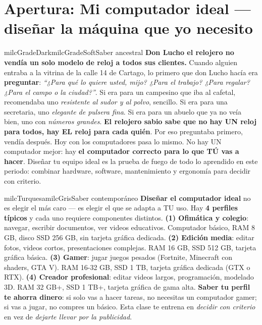 \documentclass[11pt,letterpaper]{article}
\begin{document}
\newpage

\section*{Apertura: Mi computador ideal --- diseñar la máquina que yo necesito}

\begin{softbox}{milcGradeDark}{milcGradeSoft}{Saber ancestral}
\textbf{Don Lucho el relojero no vendía un solo modelo de reloj a todos sus clientes.} Cuando alguien entraba a la vitrina de la calle 14 de Cartago, lo primero que don Lucho hacía era \textbf{preguntar}: \emph{``¿Para qué lo quiere usted, mijo? ¿Para el trabajo? ¿Para regalar? ¿Para el campo o la ciudad?''}. Si era para un campesino que iba al cafetal, recomendaba uno \emph{resistente al sudor y al polvo}, sencillo. Si era para una secretaria, uno \emph{elegante de pulsera fina}. Si era para un abuelo que ya no veía bien, uno con \emph{números grandes}. \textbf{El relojero sabio sabe que no hay UN reloj para todos, hay EL reloj para cada quién}. Por eso preguntaba primero, vendía después. Hoy con los computadores pasa lo mismo. No hay UN computador mejor: hay \textbf{el computador correcto para lo que TÚ vas a hacer}. Diseñar tu equipo ideal es la prueba de fuego de todo lo aprendido en este periodo: combinar hardware, software, mantenimiento y ergonomía para decidir con criterio.
\end{softbox}

\begin{softbox}{milcTurquesa}{milcGris}{Saber contemporáneo}
\textbf{Diseñar el computador ideal} no es elegir el más caro --- es elegir el que se adapta a TU uso. Hay \textbf{4 perfiles típicos} y cada uno requiere componentes distintos. \textbf{(1) Ofimática y colegio}: navegar, escribir documentos, ver videos educativos. Computador básico, RAM 8 GB, disco SSD 256 GB, sin tarjeta gráfica dedicada. \textbf{(2) Edición media}: editar fotos, videos cortos, presentaciones complejas. RAM 16 GB, SSD 512 GB, tarjeta gráfica básica. \textbf{(3) Gamer}: jugar juegos pesados (Fortnite, Minecraft con shaders, GTA V). RAM 16-32 GB, SSD 1 TB, tarjeta gráfica dedicada (GTX o RTX). \textbf{(4) Creador profesional}: editar videos largos, programación, modelado 3D. RAM 32 GB+, SSD 1 TB+, tarjeta gráfica de gama alta. \textbf{Saber tu perfil te ahorra dinero}: si solo vas a hacer tareas, no necesitas un computador gamer; si vas a jugar, no compres un básico. Esta clase te entrena en \emph{decidir con criterio} en vez de \emph{dejarte llevar por la publicidad}.
\end{softbox}
\end{document}
